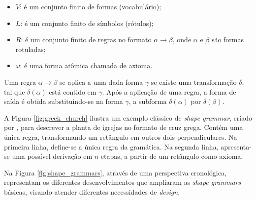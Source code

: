 \begin{itemize}
    \item $V$: é um conjunto finito de formas (vocabulário);
    \item $L$: é um conjunto finito de símbolos (rótulos);
    \item $R$: é um conjunto finito de regras no formato $\alpha \rightarrow \beta$, onde $\alpha$ e $\beta$ são formas rotuladas;
    \item $\omega$: é uma forma atômica chamada de axioma.
\end{itemize}

Uma regra $\alpha \rightarrow \beta$ se aplica a uma dada forma $\gamma$ se existe uma transformação $\delta$, tal que $\delta(\alpha)$ está contido em $\gamma$. Após a aplicação de uma regra, a forma de saída é obtida substituindo-se na forma $\gamma$, a subforma $\delta(\alpha)$ por $\delta(\beta)$.

A Figura \ref{fig:greek_church} ilustra um exemplo clássico de \textit{shape grammar}, criado por , para descrever a planta de igrejas no formato de cruz grega. Contém uma única regra, transformando um retângulo em outros dois perpendiculares. Na primeira linha, define-se a única regra da gramática. Na segunda linha, apresenta-se uma possível derivação em $n$ etapas, a partir de um retângulo como axioma.

\begin{figure}[h!]
	\centering
	\captionsetup{width=15cm}
	{}	
\end{figure}


Na Figura \ref{fig:shape_grammars}, através de uma perspectiva cronológica,  representam os diferentes desenvolvimentos que ampliaram as \textit{shape grammars} básicas, visando atender diferentes necessidades de \textit{design}.

